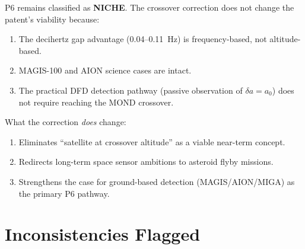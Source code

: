 \documentclass[11pt]{article}
\theoremstyle{definition}
\theoremstyle{remark}
\newcommand{\azero}{a_0}
\begin{document}
P6 remains classified as \textbf{NICHE}. The crossover correction
does not change the patent's viability because:
\begin{enumerate}[nosep]
\item The decihertz gap advantage (0.04--0.11~Hz) is frequency-based,
  not altitude-based.
\item MAGIS-100 and AION science cases are intact.
\item The practical DFD detection pathway (passive observation of
  $\delta a = \azero$) does not require reaching the MOND crossover.
\end{enumerate}

What the correction \emph{does} change:
\begin{enumerate}[nosep]
\item Eliminates ``satellite at crossover altitude'' as a viable
  near-term concept.
\item Redirects long-term space sensor ambitions to asteroid flyby
  missions.
\item Strengthens the case for ground-based detection (MAGIS/AION/MIGA)
  as the primary P6 pathway.
\end{enumerate}

\section{Inconsistencies Flagged}
\label{sec:inconsistencies}
\end{document}
